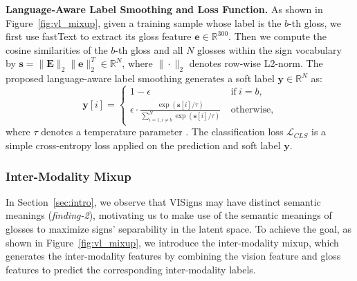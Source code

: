\documentclass[10pt,twocolumn,letterpaper]{article}
\begin{document}
\noindent\textbf{Language-Aware Label Smoothing and Loss Function.} As shown in Figure~\ref{fig:vl_mixup}, given a training sample whose label is the $b$-th gloss, we first use fastText to extract its gloss feature $\boldsymbol{e} \in \mathbb{R}^{300}$. Then we compute the cosine similarities of the $b$-th gloss and all $N$ glosses within the sign vocabulary by $\boldsymbol{s}=\|\boldsymbol{E}\|_2 \|\boldsymbol{e}\|_2^T \in \mathbb{R}^{N}$, where $\|\cdot\|_2$ denotes row-wise L2-norm. The proposed language-aware label smoothing generates a soft label $\boldsymbol{y} \in \mathbb{R}^{N}$ as:
\begin{equation}
\label{equ:lang_lbsm}
\boldsymbol{y}[i]=
\begin{cases}
    1-\epsilon \ &\text{if}\  i=b, \\
    \epsilon \cdot \frac{\exp{(\boldsymbol{s}[i]/\tau)}}{\sum_{i=1,i\neq b}^N \exp{(\boldsymbol{s}[i]/\tau)}} \  &\text{otherwise},
\end{cases}
\end{equation}
where $\tau$ denotes a temperature parameter \cite{chen2020simple}.
The classification loss $\mathcal{L}_{CLS}$ is a simple cross-entropy loss applied on the prediction and soft label $\boldsymbol{y}$.




\vspace{-4mm}
\subsubsection{Inter-Modality Mixup}
\vspace{-2mm}
\label{sec:vl_mixup}
In Section~\ref{sec:intro}, we observe that VISigns may have distinct semantic meanings (\textit{finding-2}), motivating us to make use of the semantic meanings of glosses to maximize signs' separability in the latent space. To achieve the goal, as shown in Figure~\ref{fig:vl_mixup}, we introduce the inter-modality mixup, which generates the inter-modality features by combining the vision feature and gloss features to predict the corresponding inter-modality labels.
\end{document}
